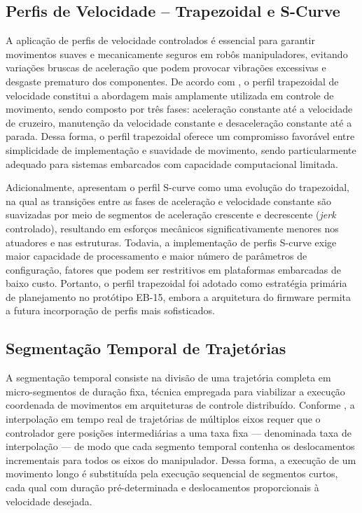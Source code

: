 \subsection{Perfis de Velocidade -- Trapezoidal e S-Curve}

A aplicação de perfis de velocidade controlados é essencial para garantir movimentos suaves e mecanicamente seguros em robôs manipuladores, evitando variações bruscas de aceleração que podem provocar vibrações excessivas e desgaste prematuro dos componentes. De acordo com , o perfil trapezoidal de velocidade constitui a abordagem mais amplamente utilizada em controle de movimento, sendo composto por três fases: aceleração constante até a velocidade de cruzeiro, manutenção da velocidade constante e desaceleração constante até a parada. Dessa forma, o perfil trapezoidal oferece um compromisso favorável entre simplicidade de implementação e suavidade de movimento, sendo particularmente adequado para sistemas embarcados com capacidade computacional limitada.

Adicionalmente,  apresentam o perfil S-curve como uma evolução do trapezoidal, na qual as transições entre as fases de aceleração e velocidade constante são suavizadas por meio de segmentos de aceleração crescente e decrescente (\textit{jerk} controlado), resultando em esforços mecânicos significativamente menores nos atuadores e nas estruturas. Todavia, a implementação de perfis S-curve exige maior capacidade de processamento e maior número de parâmetros de configuração, fatores que podem ser restritivos em plataformas embarcadas de baixo custo. Portanto, o perfil trapezoidal foi adotado como estratégia primária de planejamento no protótipo EB-15, embora a arquitetura do firmware permita a futura incorporação de perfis mais sofisticados.

\subsection{Segmentação Temporal de Trajetórias}

A segmentação temporal consiste na divisão de uma trajetória completa em micro-segmentos de duração fixa, técnica empregada para viabilizar a execução coordenada de movimentos em arquiteturas de controle distribuído. Conforme , a interpolação em tempo real de trajetórias de múltiplos eixos requer que o controlador gere posições intermediárias a uma taxa fixa — denominada taxa de interpolação — de modo que cada segmento temporal contenha os deslocamentos incrementais para todos os eixos do manipulador. Dessa forma, a execução de um movimento longo é substituída pela execução sequencial de segmentos curtos, cada qual com duração pré-determinada e deslocamentos proporcionais à velocidade desejada.

